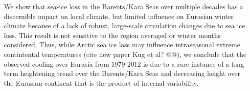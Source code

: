 \documentclass{nature}
\begin{document}
We show that sea-ice loss in the Barents/Kara Seas over multiple decades has a discernible impact on local climate, but limited influence on Eurasian winter climate because of a lack of robust, large-scale circulation changes due to sea ice loss. This result is not sensitive to the region averaged or winter months considered. Thus, while Arctic sea ice loss may influence intraseasonal extreme contintental temperatures (cite new paper Kug et al? @@), we conclude that the observed cooling over Eurasia from 1979-2012 is due to a rare instance of a long-term heightening trend over the Barents/Kara Seas and decreasing height over the Eurasian continent that is the product of internal variability. %




\end{document}
